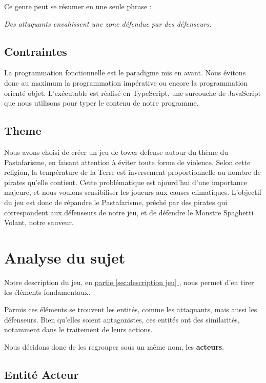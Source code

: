 \documentclass{article}
\begin{document}
Ce genre peut se résumer en une seule phrase :
\begin{center}
    \emph{Des attaquants envahissent une zone défendue par des défenseurs.}\label{sec:description jeu}
\end{center}

\subsection{Contraintes}

La programmation fonctionnelle est le paradigme mis en avant.
Nous évitons donc au maximum la programmation impérative ou encore la programmation orienté objet.
L'exécutable est réalisé en TypeScript, une surcouche de JavaScript que nous utilisons pour typer le contenu de notre programme.

\subsection{Theme}
Nous avons choisi de créer un jeu de tower defense autour du thème
du Pastafarisme, en faisant attention à éviter toute forme de violence.
Selon cette religion, la température de la Terre est inversement proportionnelle 
au nombre de pirates qu'elle contient.
Cette problématique est ajourd'hui d'une importance majeure, et nous voulons sensibiliser les joueurs aux causes climatiques.
L'objectif du jeu est donc de répandre le Pastafarisme, prêché par des pirates qui correspondent aux défenseurs de notre jeu, et de défendre le Monstre Spaghetti Volant, notre sauveur. 

\section{Analyse du sujet}\label{sec:conception}

Notre description du jeu, en \hyperref[sec:description jeu]{partie \ref{sec:description jeu} }, nous permet d'en tirer les éléments fondamentaux.

Parmis ces éléments se trouvent les entités, comme les attaquants, mais aussi les défenseurs. Bien qu'elles soient antagonistes, ces entités ont des similarités, notamment dans le traitement de leurs actions. 

Nous décidons donc de les regrouper sous un même nom, les \textbf{acteurs}.


\subsection{Entité Acteur}
\end{document}
